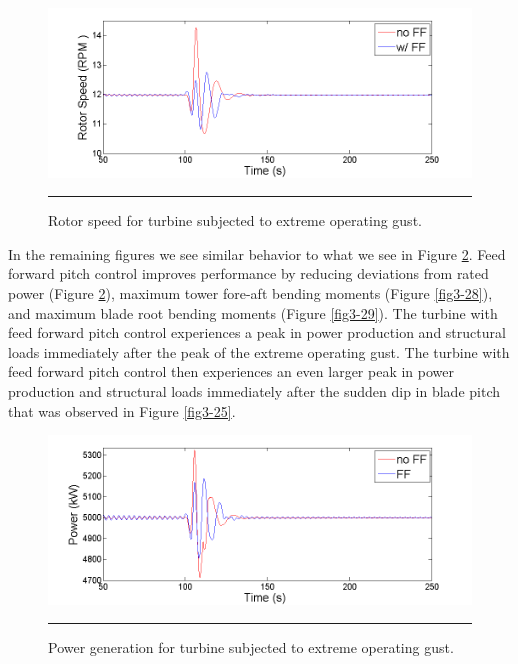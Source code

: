 \begin{figure}[htbp]
	\centering
		\includegraphics[trim = {1cm 0 2cm 0}, clip, width = \linewidth]{Figures/ch3Figures/fig3-26.png}
		\rule{35em}{0.5pt}
	\caption{Rotor speed for turbine subjected to extreme operating gust. }
	\label{fig3-26}
\end{figure}

In the remaining figures we see similar behavior to what we see in Figure \ref{fig3-27}. Feed forward pitch control improves performance by reducing deviations from rated power (Figure \ref{fig3-27}), maximum tower fore-aft bending moments (Figure \ref{fig3-28}), and maximum blade root bending moments (Figure \ref{fig3-29}). The turbine with feed forward pitch control experiences a peak in power production and structural loads immediately after the peak of the extreme operating gust. The turbine with feed forward pitch control then experiences an even larger peak in power production and structural loads immediately after the sudden dip in blade pitch that was observed in Figure \ref{fig3-25}.

\begin{figure}[htbp]
	\centering
		\includegraphics[trim = {1cm 0 2cm 0}, clip, width = \linewidth]{Figures/ch3Figures/fig3-27.png}
		\rule{35em}{0.5pt}
	\caption{Power generation for turbine subjected to extreme operating gust.}
	\label{fig3-27}
\end{figure}

